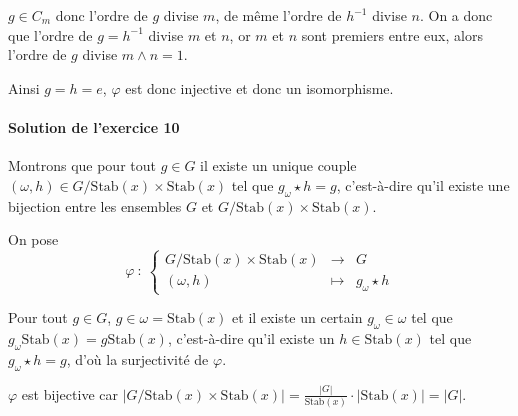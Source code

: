 \documentclass[]{article}
\theoremstyle{remark}
\theoremstyle{definition}
\newcommand{\func}[5]{
#1 ~ : ~ \left\{ \begin{array}{lcl}
	#2 & \longrightarrow & #3 \\
	#4 & \longmapsto & #5
\end{array}
\right.
}
\begin{document}
$g \in C_m$ donc l'ordre de $g$ divise $m$, de même l'ordre de $h^{-1}$ divise $n$. On a donc que l'ordre de $g=h^{-1}$ divise $m$ et $n$, or $m$ et $n$ sont premiers entre eux, alors l'ordre de $g$ divise $m \land n = 1$.

Ainsi $g = h = e$, $\varphi$ est donc injective et donc un isomorphisme.

\paragraph{Solution de l'exercice 10}

Montrons que pour tout $g \in G$ il existe un unique couple $(\omega, h) \in G / \text{Stab}(x) \times \text{Stab}(x)$ tel que $g_\omega \star h = g$, c'est-à-dire qu'il existe une bijection entre les ensembles $G$ et $G/\text{Stab}(x) \times \text{Stab}(x)$.

On pose $$\func{\varphi}{G/\text{Stab}(x) \times \text{Stab}(x)}{G}{(\omega, h)}{g_\omega \star h}$$

Pour tout $g \in G$, $g \in \omega = \text{Stab}(x)$ et il existe un certain $g_\omega \in \omega$ tel que $g_\omega \text{Stab}(x) = g \text{Stab}(x)$, c'est-à-dire qu'il existe un $h \in \text{Stab}(x)$ tel que $g_\omega \star h = g$, d'où la surjectivité de $\varphi$.

$\varphi$ est bijective car $\left|G / \text{Stab}(x) \times \text{Stab}(x)\right| = \frac{|G|}{\text{Stab}(x)} \cdot |\text{Stab}(x)| = |G|$.
\end{document}
